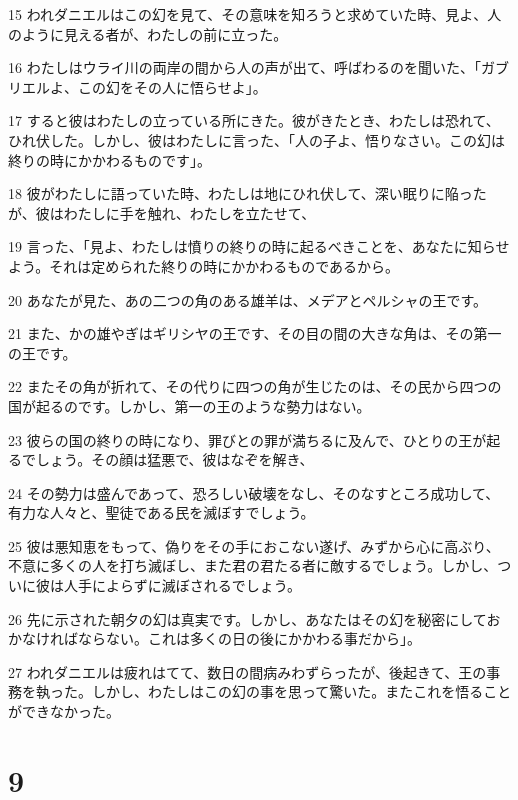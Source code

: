 \par 15 われダニエルはこの幻を見て、その意味を知ろうと求めていた時、見よ、人のように見える者が、わたしの前に立った。
\par 16 わたしはウライ川の両岸の間から人の声が出て、呼ばわるのを聞いた、「ガブリエルよ、この幻をその人に悟らせよ」。
\par 17 すると彼はわたしの立っている所にきた。彼がきたとき、わたしは恐れて、ひれ伏した。しかし、彼はわたしに言った、「人の子よ、悟りなさい。この幻は終りの時にかかわるものです」。
\par 18 彼がわたしに語っていた時、わたしは地にひれ伏して、深い眠りに陥ったが、彼はわたしに手を触れ、わたしを立たせて、
\par 19 言った、「見よ、わたしは憤りの終りの時に起るべきことを、あなたに知らせよう。それは定められた終りの時にかかわるものであるから。
\par 20 あなたが見た、あの二つの角のある雄羊は、メデアとペルシャの王です。
\par 21 また、かの雄やぎはギリシヤの王です、その目の間の大きな角は、その第一の王です。
\par 22 またその角が折れて、その代りに四つの角が生じたのは、その民から四つの国が起るのです。しかし、第一の王のような勢力はない。
\par 23 彼らの国の終りの時になり、罪びとの罪が満ちるに及んで、ひとりの王が起るでしょう。その顔は猛悪で、彼はなぞを解き、
\par 24 その勢力は盛んであって、恐ろしい破壊をなし、そのなすところ成功して、有力な人々と、聖徒である民を滅ぼすでしょう。
\par 25 彼は悪知恵をもって、偽りをその手におこない遂げ、みずから心に高ぶり、不意に多くの人を打ち滅ぼし、また君の君たる者に敵するでしょう。しかし、ついに彼は人手によらずに滅ぼされるでしょう。
\par 26 先に示された朝夕の幻は真実です。しかし、あなたはその幻を秘密にしておかなければならない。これは多くの日の後にかかわる事だから」。
\par 27 われダニエルは疲れはてて、数日の間病みわずらったが、後起きて、王の事務を執った。しかし、わたしはこの幻の事を思って驚いた。またこれを悟ることができなかった。

\chapter{9}

